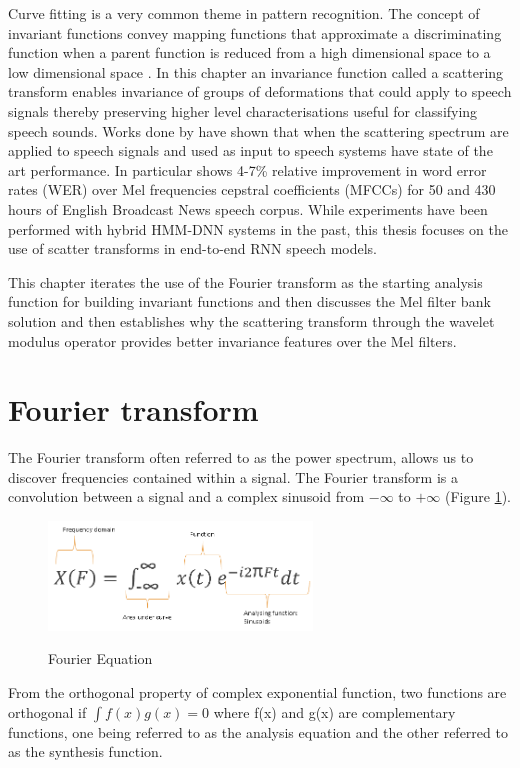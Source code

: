Curve fitting is a very common theme in pattern recognition. The concept of invariant functions convey mapping functions that approximate a discriminating function when a parent function is reduced from a high dimensional space to a low dimensional space \cite{mallat2016understanding}.  In this chapter an invariance function called a scattering transform  enables invariance of groups of deformations that could apply to speech signals thereby preserving higher level characterisations useful for classifying speech sounds. Works done by \citep{peddinti2014deep,zeghidour2016deep,anden2011multiscale,sainath2014deep} have shown that when the scattering spectrum are applied to speech signals and used as input to speech systems have state of the art performance.  In particular \cite{sainath2014deep} shows 4-7\% relative improvement in word error rates (WER) over Mel frequencies cepstral coefficients (MFCCs) for 50 and 430 hours of English Broadcast News speech corpus.  While experiments have been performed with hybrid HMM-DNN systems in the past, this thesis focuses on the use of scatter transforms in end-to-end RNN speech models.

This chapter iterates the use of the Fourier transform as the starting analysis function for building invariant functions and then discusses the Mel filter bank solution and then establishes why the scattering transform through the wavelet modulus operator provides better invariance features over the Mel filters.

\section{Fourier transform}
The Fourier transform often referred to as the power spectrum, allows us to discover frequencies contained within a signal.  The Fourier transform is a convolution between a signal and a complex sinusoid from $-\infty$ to $+\infty$ (Figure \ref{fig_4_1_fourier_eqn}). 

\begin{figure}
\centering
  \includegraphics[width=7cm]{thesis/images/fourier.png}\\
  \caption{Fourier Equation} \label{fig_4_1_fourier_eqn}
\end{figure}
From the orthogonal property of complex exponential function, two functions are orthogonal if $\int f(x)g(x)=0$ where f(x) and g(x) are complementary functions, one being referred to as the analysis equation and the other referred to as the synthesis function.

